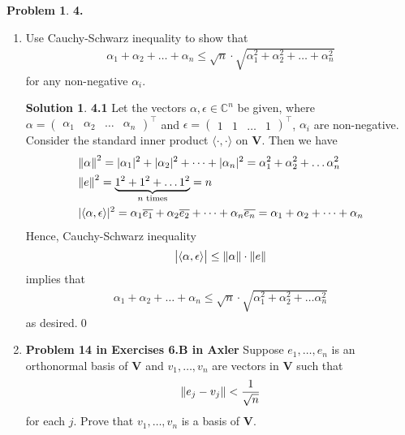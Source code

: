 \documentclass{article}
\theoremstyle{definition}
\newtheorem*{prob*}{Problem}
\newtheorem*{sln*}{Solution}
\newcommand{\V}{\mathbf{V}}
\newcommand{\la}{\langle}
\newcommand{\ra}{\rangle}
\begin{document}
\newpage





\begin{prob*}\textbf{4.}
	\begin{enumerate}
		\item Use Cauchy-Schwarz inequality to show that 
		\begin{align*}
		\alpha_1 + \alpha_2 + \dots + \alpha_n \leq 
		\sqrt{n}\cdot \sqrt{\alpha_1^2+ \alpha_2^2 + \dots + \alpha_n^2}
		\end{align*}
		for any non-negative $\alpha_i$.
		
		\begin{sln*}\textbf{4.1}
			Let the vectors $\alpha, \epsilon \in \mathbb{C}^n $ be given, where $\alpha = \begin{pmatrix}
			\alpha_1 & \alpha_2 & \dots & \alpha_n
			\end{pmatrix}^\top$ and $\epsilon = \begin{pmatrix}
			1 & 1 & \dots & 1
			\end{pmatrix}^\top$, $\alpha_i$ are non-negative. Consider the standard inner product $\la \cdot,\cdot \ra$ on $\V$. Then we have
			\begin{align*}
			&\norm{\alpha}^2 = \vert \alpha_1 \vert^2 + \vert \alpha_2 \vert^2 + \dots + \vert \alpha_n \vert^2 = \alpha_1^2 + \alpha_2^2 + \dots \alpha_n^2\\
			&\norm{e}^2  = \underbrace{1^2 + 1^2 + \dots 1^2}_{n \text{ times}} = n\\
			&\vert \la \alpha,\epsilon\ra\vert^2 = \alpha_1 \overline{e_1} +  \alpha_2 \overline{e_2} +  \dots + \alpha_n \overline{e_n} = \alpha_1 + \alpha_2 + \dots + \alpha_n 
			\end{align*} Hence, Cauchy-Schwarz inequality
			\begin{align*}
			\big\vert \la \alpha , \epsilon \ra \big\vert \leq \norm{\alpha}\cdot \norm{e}
			\end{align*}
			implies that 
			\begin{align*}
			\alpha_1 + \alpha_2 + \dots + \alpha_n  \leq \sqrt{n}\cdot \sqrt{\alpha_1^2 + \alpha_2^2 + \dots \alpha_n^2}
			\end{align*}
			as desired.\qed
		\end{sln*}
	
	
		\newpage
		
		
		
		\item \textbf{Problem 14 in Exercises 6.B in Axler} Suppose $e_1,\dots,e_n$ is an orthonormal basis of $\V$ and $v_1,\dots,v_n$ are vectors in $\V$ such that
		\begin{align*}
		\norm{e_j - v_j } < \frac{1}{\sqrt{n}}
		\end{align*}
		for each $j$. Prove that $v_1,\dots,v_n$ is a basis of $\V$.
		

\end{enumerate}
\end{prob*}
\end{document}

